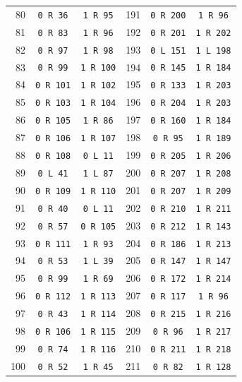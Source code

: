 \begin{longtable}{@{}rcc@{\hspace{14mm}}rcc@{}}
80 & \texttt{0 R 36} & \texttt{1 R 95} & 191 & \texttt{0 R 200} & \texttt{1 R 96}\\
81 & \texttt{0 R 83} & \texttt{1 R 96} & 192 & \texttt{0 R 201} & \texttt{1 R 202}\\
82 & \texttt{0 R 97} & \texttt{1 R 98} & 193 & \texttt{0 L 151} & \texttt{1 L 198}\\
83 & \texttt{0 R 99} & \texttt{1 R 100} & 194 & \texttt{0 R 145} & \texttt{1 R 184}\\
84 & \texttt{0 R 101} & \texttt{1 R 102} & 195 & \texttt{0 R 133} & \texttt{1 R 203}\\
85 & \texttt{0 R 103} & \texttt{1 R 104} & 196 & \texttt{0 R 204} & \texttt{1 R 203}\\
86 & \texttt{0 R 105} & \texttt{1 R 86} & 197 & \texttt{0 R 160} & \texttt{1 R 184}\\
87 & \texttt{0 R 106} & \texttt{1 R 107} & 198 & \texttt{0 R 95} & \texttt{1 R 189}\\
88 & \texttt{0 R 108} & \texttt{0 L 11} & 199 & \texttt{0 R 205} & \texttt{1 R 206}\\
89 & \texttt{0 L 41} & \texttt{1 L 87} & 200 & \texttt{0 R 207} & \texttt{1 R 208}\\
90 & \texttt{0 R 109} & \texttt{1 R 110} & 201 & \texttt{0 R 207} & \texttt{1 R 209}\\
91 & \texttt{0 R 40} & \texttt{0 L 11} & 202 & \texttt{0 R 210} & \texttt{1 R 211}\\
92 & \texttt{0 R 57} & \texttt{0 R 105} & 203 & \texttt{0 R 212} & \texttt{1 R 143}\\
93 & \texttt{0 R 111} & \texttt{1 R 93} & 204 & \texttt{0 R 186} & \texttt{1 R 213}\\
94 & \texttt{0 R 53} & \texttt{1 L 39} & 205 & \texttt{0 R 147} & \texttt{1 R 147}\\
95 & \texttt{0 R 99} & \texttt{1 R 69} & 206 & \texttt{0 R 172} & \texttt{1 R 214}\\
96 & \texttt{0 R 112} & \texttt{1 R 113} & 207 & \texttt{0 R 117} & \texttt{1 R 96}\\
97 & \texttt{0 R 43} & \texttt{1 R 114} & 208 & \texttt{0 R 215} & \texttt{1 R 216}\\
98 & \texttt{0 R 106} & \texttt{1 R 115} & 209 & \texttt{0 R 96} & \texttt{1 R 217}\\
99 & \texttt{0 R 74} & \texttt{1 R 116} & 210 & \texttt{0 R 211} & \texttt{1 R 218}\\
100 & \texttt{0 R 52} & \texttt{1 R 45} & 211 & \texttt{0 R 82} & \texttt{1 R 128}\\

\end{longtable}
